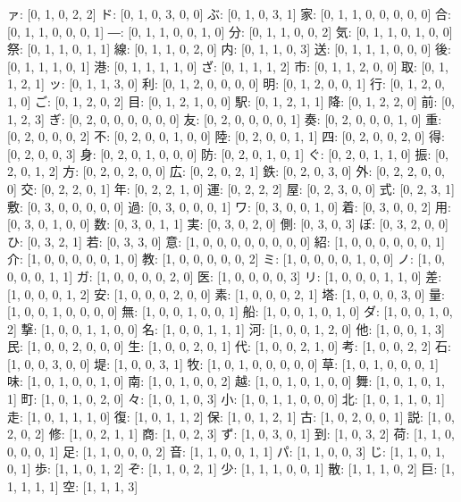 \documentclass[a4paper,10pt,ngerman]{scrartcl}
\begin{document}
ァ: [0, 1, 0, 2, 2]
ド: [0, 1, 0, 3, 0, 0]
ぶ: [0, 1, 0, 3, 1]
家: [0, 1, 1, 0, 0, 0, 0, 0]
合: [0, 1, 1, 0, 0, 0, 1]
―: [0, 1, 1, 0, 0, 1, 0]
分: [0, 1, 1, 0, 0, 2]
気: [0, 1, 1, 0, 1, 0, 0]
祭: [0, 1, 1, 0, 1, 1]
線: [0, 1, 1, 0, 2, 0]
内: [0, 1, 1, 0, 3]
送: [0, 1, 1, 1, 0, 0, 0]
後: [0, 1, 1, 1, 0, 1]
港: [0, 1, 1, 1, 1, 0]
ざ: [0, 1, 1, 1, 2]
市: [0, 1, 1, 2, 0, 0]
取: [0, 1, 1, 2, 1]
ッ: [0, 1, 1, 3, 0]
利: [0, 1, 2, 0, 0, 0, 0]
明: [0, 1, 2, 0, 0, 1]
行: [0, 1, 2, 0, 1, 0]
ご: [0, 1, 2, 0, 2]
目: [0, 1, 2, 1, 0, 0]
駅: [0, 1, 2, 1, 1]
降: [0, 1, 2, 2, 0]
前: [0, 1, 2, 3]
ぎ: [0, 2, 0, 0, 0, 0, 0, 0]
友: [0, 2, 0, 0, 0, 0, 1]
奏: [0, 2, 0, 0, 0, 1, 0]
重: [0, 2, 0, 0, 0, 2]
不: [0, 2, 0, 0, 1, 0, 0]
陸: [0, 2, 0, 0, 1, 1]
四: [0, 2, 0, 0, 2, 0]
得: [0, 2, 0, 0, 3]
身: [0, 2, 0, 1, 0, 0, 0]
防: [0, 2, 0, 1, 0, 1]
ぐ: [0, 2, 0, 1, 1, 0]
振: [0, 2, 0, 1, 2]
方: [0, 2, 0, 2, 0, 0]
広: [0, 2, 0, 2, 1]
鉄: [0, 2, 0, 3, 0]
外: [0, 2, 2, 0, 0, 0]
交: [0, 2, 2, 0, 1]
年: [0, 2, 2, 1, 0]
運: [0, 2, 2, 2]
屋: [0, 2, 3, 0, 0]
式: [0, 2, 3, 1]
敷: [0, 3, 0, 0, 0, 0, 0]
過: [0, 3, 0, 0, 0, 1]
ワ: [0, 3, 0, 0, 1, 0]
着: [0, 3, 0, 0, 2]
用: [0, 3, 0, 1, 0, 0]
数: [0, 3, 0, 1, 1]
実: [0, 3, 0, 2, 0]
側: [0, 3, 0, 3]
ぼ: [0, 3, 2, 0, 0]
ひ: [0, 3, 2, 1]
若: [0, 3, 3, 0]
意: [1, 0, 0, 0, 0, 0, 0, 0, 0]
紹: [1, 0, 0, 0, 0, 0, 0, 1]
介: [1, 0, 0, 0, 0, 0, 1, 0]
教: [1, 0, 0, 0, 0, 0, 2]
ミ: [1, 0, 0, 0, 0, 1, 0, 0]
ノ: [1, 0, 0, 0, 0, 1, 1]
ガ: [1, 0, 0, 0, 0, 2, 0]
医: [1, 0, 0, 0, 0, 3]
リ: [1, 0, 0, 0, 1, 1, 0]
差: [1, 0, 0, 0, 1, 2]
安: [1, 0, 0, 0, 2, 0, 0]
素: [1, 0, 0, 0, 2, 1]
塔: [1, 0, 0, 0, 3, 0]
量: [1, 0, 0, 1, 0, 0, 0, 0]
無: [1, 0, 0, 1, 0, 0, 1]
船: [1, 0, 0, 1, 0, 1, 0]
ダ: [1, 0, 0, 1, 0, 2]
撃: [1, 0, 0, 1, 1, 0, 0]
名: [1, 0, 0, 1, 1, 1]
河: [1, 0, 0, 1, 2, 0]
他: [1, 0, 0, 1, 3]
民: [1, 0, 0, 2, 0, 0, 0]
生: [1, 0, 0, 2, 0, 1]
代: [1, 0, 0, 2, 1, 0]
考: [1, 0, 0, 2, 2]
石: [1, 0, 0, 3, 0, 0]
堤: [1, 0, 0, 3, 1]
牧: [1, 0, 1, 0, 0, 0, 0, 0]
草: [1, 0, 1, 0, 0, 0, 1]
味: [1, 0, 1, 0, 0, 1, 0]
南: [1, 0, 1, 0, 0, 2]
越: [1, 0, 1, 0, 1, 0, 0]
舞: [1, 0, 1, 0, 1, 1]
町: [1, 0, 1, 0, 2, 0]
々: [1, 0, 1, 0, 3]
小: [1, 0, 1, 1, 0, 0, 0]
北: [1, 0, 1, 1, 0, 1]
走: [1, 0, 1, 1, 1, 0]
復: [1, 0, 1, 1, 2]
保: [1, 0, 1, 2, 1]
古: [1, 0, 2, 0, 0, 1]
説: [1, 0, 2, 0, 2]
修: [1, 0, 2, 1, 1]
商: [1, 0, 2, 3]
ず: [1, 0, 3, 0, 1]
到: [1, 0, 3, 2]
荷: [1, 1, 0, 0, 0, 0, 1]
足: [1, 1, 0, 0, 0, 2]
音: [1, 1, 0, 0, 1, 1]
パ: [1, 1, 0, 0, 3]
じ: [1, 1, 0, 1, 0, 1]
歩: [1, 1, 0, 1, 2]
ぞ: [1, 1, 0, 2, 1]
少: [1, 1, 1, 0, 0, 1]
散: [1, 1, 1, 0, 2]
巨: [1, 1, 1, 1, 1]
空: [1, 1, 1, 3]
\end{document}
